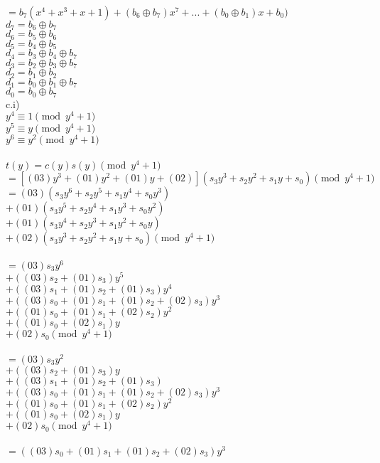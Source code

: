 \documentclass{assignment}
\begin{document}
\begin{problemlist}
\begin{problem}
\begin{answer}
$=b_7(x^4+x^3+x+1)+(b_6\oplus b_7)x^7+...+(b_0\oplus b_1)x+b_0)$\\
$d_7=b_6\oplus b_7$\\
$d_6=b_5\oplus b_6$\\
$d_5=b_4\oplus b_5$\\
$d_4=b_3\oplus b_4 \oplus b_7$\\
$d_3=b_2\oplus b_3 \oplus b_7$\\
$d_2=b_1\oplus b_2$\\
$d_1=b_0\oplus b_1 \oplus b_7$\\
$d_0=b_0 \oplus b_7$\\

c.i)\\
$y^4\equiv 1 \pmod {y^4+1}$\\
$y^5\equiv y \pmod {y^4+1}$\\
$y^6\equiv y^2 \pmod {y^4+1}$\\
\\
$t(y)=c(y)s(y) \pmod {y^4+1}$\\
$=[(03)y^3+(01)y^2+(01)y+(02)](s_3y^3+s_2y^2+s_1y+s_0) \pmod {y^4+1}$\\
$=(03)(s_3y^6+s_2y^5+s_1y^4+s_0y^3)$\\
$+(01)(s_3y^5+s_2y^4+s_1y^3+s_0y^2)$\\
$+(01)(s_3y^4+s_2y^3+s_1y^2+s_0y)$\\
$+(02)(s_3y^3+s_2y^2+s_1y+s_0) \pmod {y^4+1}$\\
\\
$=(03)s_3y^6$\\
$+((03)s_2+(01)s_3)y^5$\\
$+((03)s_1+(01)s_2+(01)s_3)y^4$\\
$+((03)s_0+(01)s_1+(01)s_2+(02)s_3)y^3$\\
$+((01)s_0+(01)s_1+(02)s_2)y^2$\\
$+((01)s_0+(02)s_1)y$\\
$+(02)s_0 \pmod {y^4+1}$\\
\\
$=(03)s_3y^2$\\
$+((03)s_2+(01)s_3)y$\\
$+((03)s_1+(01)s_2+(01)s_3)$\\
$+((03)s_0+(01)s_1+(01)s_2+(02)s_3)y^3$\\
$+((01)s_0+(01)s_1+(02)s_2)y^2$\\
$+((01)s_0+(02)s_1)y$\\
$+(02)s_0 \pmod {y^4+1}$\\
\\
$=((03)s_0+(01)s_1+(01)s_2+(02)s_3)y^3$\\

\end{answer}
\end{problem}
\end{problemlist}
\end{document}
